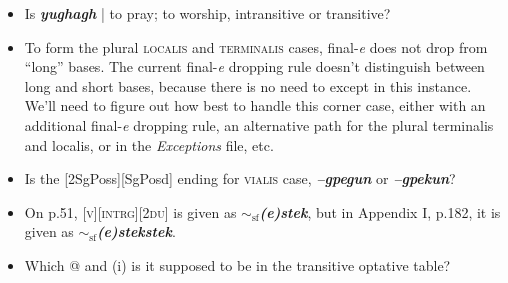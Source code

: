\documentclass{article}
\begin{document}
\begin{itemize}
\renewcommand\labelitemi{$\cdot$}

\item Is \textit{\textbf{yughagh}} | to pray; to worship, intransitive or transitive?

\item To form the plural \textsc{localis} and \textsc{terminalis} cases, final-\textit{e} does not drop from ``long'' bases.
%
The current final-\textit{e} dropping rule doesn't distinguish between long and short bases, because there is no need to except in this instance.
%
We'll need to figure out how best to handle this corner case, either with an additional final-\textit{e} dropping rule, an alternative path for the plural terminalis and localis, or in the \textit{Exceptions} file, etc.

\item Is the [2SgPoss][SgPosd] ending for \textsc{vialis} case, \textit{\textbf{--gpegun}} or \textit{\textbf{--gpekun}}?

\item On p.51, \textsc{[v][intrg][2du]} is given as \textit{\textbf{$\sim_\text{sf}$(e)stek}}, but in Appendix I, p.182, it is given as \textit{\textbf{$\sim_\text{sf}$(e)stekstek}}.

\item Which @ and (i) is it supposed to be in the transitive optative table?

\end{itemize}
\end{document}
